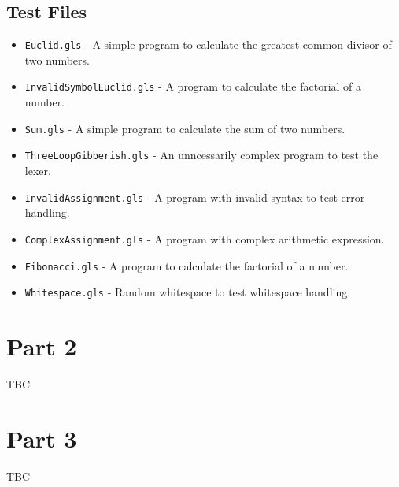 \documentclass{article}
\begin{document}
	\subsection{Test Files}
	\begin{itemize}
		\item \texttt{Euclid.gls} - A simple program to calculate the greatest common divisor of two numbers.
		\item \texttt{InvalidSymbolEuclid.gls} - A program to calculate the factorial of a number.
		\item \texttt{Sum.gls} - A simple program to calculate the sum of two numbers.
		\item \texttt{ThreeLoopGibberish.gls} - An unncessarily complex program to test the lexer.
		\item \texttt{InvalidAssignment.gls} - A program with invalid syntax to test error handling.
		\item \texttt{ComplexAssignment.gls} - A program with complex arithmetic expression.
		\item \texttt{Fibonacci.gls} - A program to calculate the factorial of a number.
		\item \texttt{Whitespace.gls} - Random whitespace to test whitespace handling.
	\end{itemize}

	\newpage

	\section{Part 2}
	TBC
	\newpage

	\section{Part 3}
	TBC

	
\end{document}
